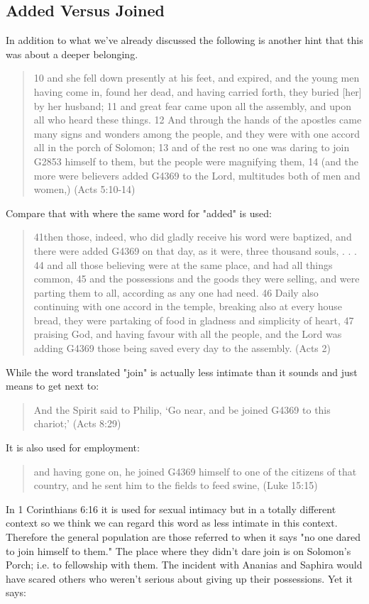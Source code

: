 \documentclass[11pt]{article}
\begin{document}
\subsection{Added Versus Joined} \label{added versus joined}
In addition to what we've already discussed the following is another hint that this was about a deeper belonging.
\begin{quote}
10 and she fell down presently at his feet, and expired, and the young men having come in, found her dead, and having carried forth, they buried [her] by her husband;
11 and great fear came upon all the assembly, and upon all who heard these things.
12 And through the hands of the apostles came many signs and wonders among the people, and they were with one accord all in the porch of Solomon;
13 and of the rest no one was daring to join G2853 himself to them, but the people were magnifying them,
14 (and the more were believers added G4369 to the Lord, multitudes both of men and women,) (Acts 5:10-14)
\end{quote}
Compare that with where the same word for "added" is used:
\begin{quote}
 41then those, indeed, who did gladly receive his word were baptized, and there were added G4369 on that day, as it were, three thousand souls, . . .
44 and all those believing were at the same place, and had all things common,
45 and the possessions and the goods they were selling, and were parting them to all, according as any one had need.
46 Daily also continuing with one accord in the temple, breaking also at every house bread, they were partaking of food in gladness and simplicity of heart,
47 praising God, and having favour with all the people, and the Lord was adding G4369 those being saved every day to the assembly. (Acts 2)
\end{quote}
While the word translated "join" is actually less intimate than it sounds and just means to get next to:
\begin{quote}
And the Spirit said to Philip, `Go near, and be joined G4369 to this chariot;'
(Acts 8:29)
\end{quote}
It is also used for employment:
\begin{quote}
and having gone on, he joined G4369 himself to one of the citizens of that country, and he sent him to the fields to feed swine,
(Luke 15:15)
\end{quote}
In 1 Corinthians 6:16 it is used for sexual intimacy but in a totally different context so we think we can regard this word as less intimate in this context. Therefore the general population are those referred to when it says "no one dared to join himself to them." The place where they didn't dare join is on Solomon's Porch; i.e. to fellowship with them. The incident with Ananias and Saphira would have scared others who weren't serious about giving up their possessions. Yet it says:
\end{document}
